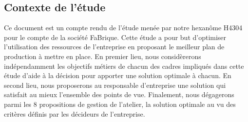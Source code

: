 \documentclass[12pt]{article}
\begin{document}
\subsection{Contexte de l'étude}
Ce document est un compte rendu de l'étude menée par notre hexanôme H4304 pour le compte de la société FaBrique. Cette étude a pour but d'optimiser l'utilisation des ressources de l'entreprise en proposant le meilleur plan de production à mettre en place. \newline
En premier lieu, nous considèrerons indépendamment les objectifs métiers de chacun des cadres impliqués dans cette étude d'aide à la décision pour apporter une solution optimale à chacun.
En second lieu, nous proposerons au responsable d'entreprise une solution qui satisfait au mieux l'ensemble des points de vue.
Finalement, nous dégagerons parmi les 8 propositions de gestion de l'atelier, la solution optimale au vu des critères définis par les décideurs de l'entreprise.    
\end{document}
